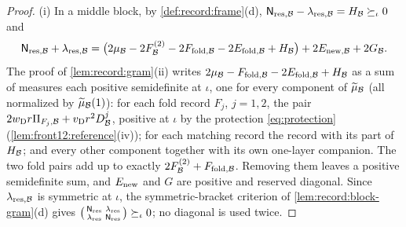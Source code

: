 \begin{proof}
(i) In a middle block, by \cref{def:record:frame}(d),
$\mathsf N_{{\rm res},\mathcal B}-\lambda_{{\rm res},\mathcal B}=H_\mathcal B\succeq_\iota0$ and
\[
 \mathsf N_{{\rm res},\mathcal B}+\lambda_{{\rm res},\mathcal B}=\bigl(2\mu_\mathcal B-2F^{(2)}_\mathcal B
 -2F_{{\rm fold},\mathcal B}-2E_{{\rm fold},\mathcal B}+H_\mathcal B\bigr)+2E_{{\rm new},\mathcal B}+2G_\mathcal B .
\]
The proof of \cref{lem:record:gram}(ii) writes
$2\mu_\mathcal B-F_{{\rm fold},\mathcal B}-2E_{{\rm fold},\mathcal B}+H_\mathcal B$ as a sum of measures each
positive semidefinite at $\iota$, one for every component of $\widetilde\mu_\mathcal B$
(all normalized by $\widetilde\mu_\mathcal B(1)$): for each fold record $F_j$, $j=1,2$,
the pair $2w_{\rm D}r\Pi_{F_j,\mathcal B}+v_{\rm D}r^2D^j_\mathcal B$, positive at $\iota$ by the
protection \eqref{eq:protection} (\cref{lem:front12:reference}(iv)); for each
matching record the record with its part of $H_\mathcal B$; and every other component
together with its own one-layer companion. The two fold pairs add up to
exactly $2F^{(2)}_\mathcal B+F_{{\rm fold},\mathcal B}$. Removing them leaves a positive
semidefinite sum, and $E_{\rm new}$ and $G$ are positive and reserved diagonal.
Since $\lambda_{{\rm res},\mathcal B}$ is symmetric at $\iota$, the symmetric-bracket
criterion of \cref{lem:record:block-gram}(d) gives
$\bigl(\begin{smallmatrix}\mathsf N_{\rm res}&\lambda_{\rm res}\\
\lambda_{\rm res}&\mathsf N_{\rm res}\end{smallmatrix}\bigr)\succeq_\iota0$; no
diagonal is used twice.


\end{proof}
